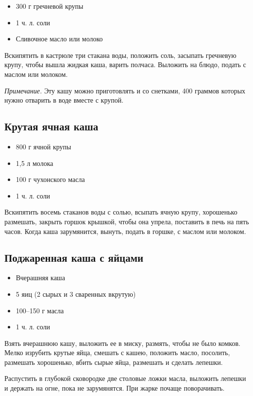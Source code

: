 \begin{itemize}
	\item 300 г гречневой крупы
    \item 1 ч. л. соли 
    \item Сливочное масло или молоко
\end{itemize}

Вскипятить в кастрюле три стакана воды, положить соль, засыпать гречневую крупу, чтобы вышла жидкая каша, варить полчаса. Выложить на блюдо, подать с маслом или молоком.

\emph{Примечание.} Эту кашу можно приготовлять и со снетками, 400 граммов которых нужно отварить в воде вместе с крупой.

\subsection{Крутая ячная каша}

\begin{itemize}
	\item 800 г ячной крупы
    \item 1,5 л молока 
    \item 100 г чухонского масла
    \item 1 ч. л. соли
\end{itemize}

Вскипятить восемь стаканов воды с солью, всыпать ячную крупу, хорошенько размешать, закрыть горшок крышкой, чтобы она упрела, поставить в печь на пять часов. Когда каша зарумянится, вынуть, подать в горшке, с маслом или молоком.

\subsection{Поджаренная каша с яйцами}

\begin{itemize}
	\item Вчерашняя каша
    \item 5 яиц (2 сырых и 3 сваренных вкрутую) 
    \item 100–150 г масла
    \item 1 ч. л. соли
\end{itemize}

Взять вчерашнюю кашу, выложить ее в миску, размять, чтобы не было комков. Мелко изрубить крутые яйца, смешать с кашею, положить масло, посолить, размешать хорошенько, вбить сырые яйца, размешать и сделать лепешки.

Распустить в глубокой сковородке две столовые ложки масла, выложить лепешки и держать на огне, пока не зарумянятся. При жарке почаще поворачивать.

